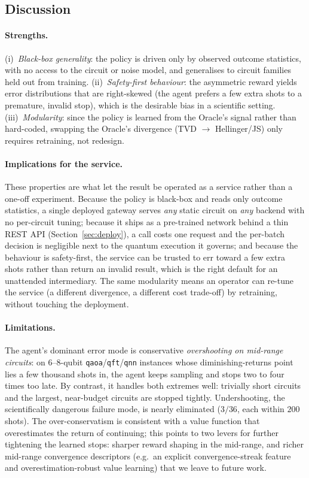 \documentclass[runningheads]{llncs}
\begin{document}
\subsection{Discussion}

\paragraph{Strengths.} (i)~\emph{Black-box generality}: the policy is driven only
by observed outcome statistics, with no access to the circuit or noise model, and
generalises to circuit families held out from training. (ii)~\emph{Safety-first
behaviour}: the asymmetric reward yields error distributions that are right-skewed
(the agent prefers a few extra shots to a premature, invalid stop), which is the
desirable bias in a scientific setting. (iii)~\emph{Modularity}: since the policy
is learned from the Oracle's signal rather than hard-coded, swapping the Oracle's
divergence (TVD $\to$ Hellinger/JS) only requires retraining, not redesign.

\paragraph{Implications for the service.} These properties are what let the
result be operated as a service rather than a one-off experiment. Because the
policy is black-box and reads only outcome statistics, a single deployed gateway
serves \emph{any} static circuit on \emph{any} backend with no per-circuit
tuning; because it ships as a pre-trained network behind a thin REST API
(Section~\ref{sec:deploy}), a call costs one request and the per-batch decision
is negligible next to the quantum execution it governs; and because the behaviour
is safety-first, the service can be trusted to err toward a few extra shots
rather than return an invalid result, which is the right default for an
unattended intermediary. The same modularity means an operator can re-tune the
service (a different divergence, a different cost trade-off) by retraining,
without touching the deployment.

\paragraph{Limitations.} The agent's dominant error mode is conservative
\emph{overshooting on mid-range circuits}: on $6$--$8$-qubit \texttt{qaoa}/\texttt{qft}/\texttt{qnn}
instances whose diminishing-returns point lies a few thousand shots in, the
agent keeps sampling and stops two to four times too late. By contrast, it
handles both extremes well: trivially short circuits and the largest,
near-budget circuits are stopped tightly. Undershooting, the scientifically
dangerous failure mode, is nearly eliminated ($3/36$, each within $200$ shots).
The over-conservatism is consistent with a value function that overestimates the
return of continuing; this points to two levers for further tightening the
learned stops: sharper reward shaping in the mid-range, and richer
mid-range convergence descriptors (e.g.\ an explicit convergence-streak feature
and overestimation-robust value learning) that we leave to future work.
\end{document}
